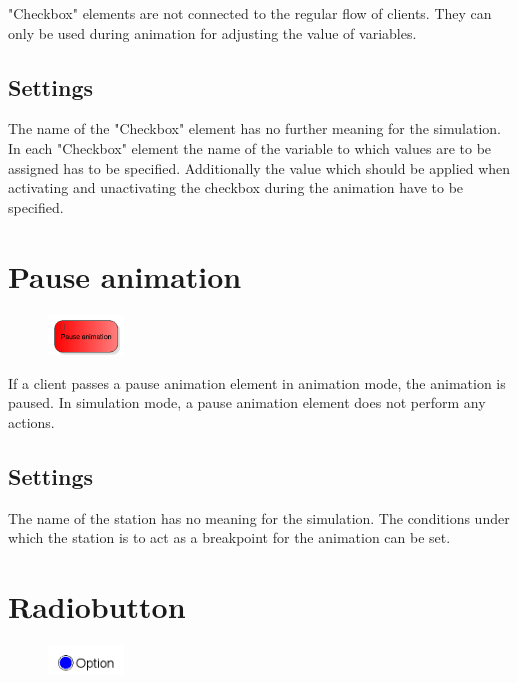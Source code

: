 "Checkbox" elements are not connected to the regular flow of clients.
They can only be used during animation for adjusting the value of
variables.

\subsection*{Settings}

The name of the "Checkbox" element has no further meaning for the simulation.
In each "Checkbox" element the name of the variable to which values are to
be assigned has to be specified. Additionally the value which should be
applied when activating and unactivating the checkbox during the animation
have to be specified.  


\section{Pause animation}
\label{ref:ModelElementAnimationPause}

\begin{figure}
\vspace{-22pt}
\includegraphics[width=2cm]{imageModelElementAnimationPause.png}
\vspace{-22pt}
\end{figure}

If a client passes a pause animation element in animation mode, the animation is paused.
In simulation mode, a pause animation element does not perform any actions.

\subsection*{Settings}

The name of the station has no meaning for the simulation.
The conditions under which the station is to act as a breakpoint
for the animation can be set.


\section{Radiobutton}
\label{ref:ModelElementInteractiveRadiobutton}

\begin{figure}
\vspace{-22pt}
\includegraphics[width=2cm]{imageModelElementInteractiveRadiobutton.png}
\vspace{-22pt}
\end{figure}

